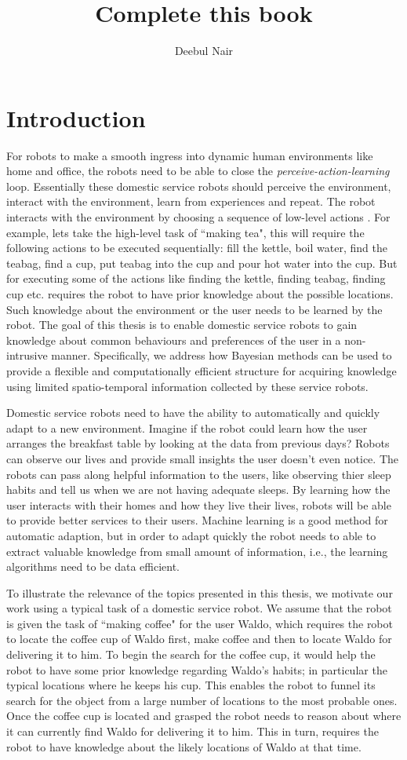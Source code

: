 \documentclass[11pt]{book}
\title{\textbf{Complete this book }}
\author{Deebul Nair}
\date{}
\begin{document}
\chapter{Introduction}


For robots to make a smooth ingress into dynamic human environments like home and office, the robots need to be able to close the \emph{perceive-action-learning} loop. Essentially these domestic service robots should perceive the environment, interact with the environment, learn from experiences and repeat. The robot interacts with the environment by choosing a sequence of low-level actions . For example, lets take the high-level task of ``making tea", this will require the following actions to be executed sequentially: fill the kettle, boil water, find the teabag, find a cup, put teabag into the cup and pour hot water into the cup. But for executing some of the actions like finding the kettle, finding teabag, finding cup etc. requires the robot to have prior knowledge about the possible locations. Such knowledge about the environment or the user needs to be learned by the robot. The goal of this thesis is to enable domestic service robots to gain knowledge about common behaviours and preferences of the user in a non-intrusive manner. Specifically, we address how Bayesian methods can be used to provide a flexible and computationally efficient structure for acquiring knowledge using limited spatio-temporal information collected by these service robots.

Domestic service robots need to have the ability to automatically and quickly adapt to a new environment. Imagine if the robot could learn how the user arranges the breakfast table by looking at the data from previous days? Robots can observe our lives and provide small insights the user doesn’t even notice. The robots can pass along helpful information to the users, like observing thier sleep habits and tell us when we are not having adequate sleeps. By learning how the user interacts with their homes and how they live their lives, robots will be able to provide better services to their users. Machine learning is a good method for automatic adaption, but in order to adapt quickly the robot needs to able to extract valuable knowledge from small amount of information, i.e., the learning algorithms need to be data efficient.

To illustrate the relevance of the topics presented in this thesis, we motivate our work using a typical task of a domestic service robot.   We assume that the robot is given the task of ``making coffee" for the user Waldo, which requires the robot to locate the coffee cup of Waldo first, make coffee and then to locate Waldo for delivering it to him. To begin the search for the coffee cup, it would help the robot to have some prior knowledge regarding Waldo's habits; in particular the typical locations where he keeps his cup. This enables the robot to funnel its search for the object from a large number of locations to the most probable ones. Once the coffee cup is located and grasped the robot needs to reason about where it can currently find Waldo for delivering it to him. This in turn, requires the robot to have knowledge about the likely locations of Waldo at that time.
\end{document}
